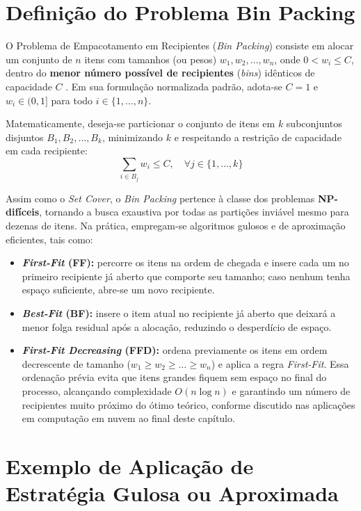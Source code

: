 \section{Definição do Problema Bin Packing}

O Problema de Empacotamento em Recipientes (\textit{Bin Packing}) consiste em alocar um conjunto de $n$ itens com tamanhos (ou pesos) $w_1, w_2, \dots, w_n$, onde $0 < w_i \le C$, dentro do \textbf{menor número possível de recipientes} (\textit{bins}) idênticos de capacidade $C$ \cite{goldbarg2005, miyazawa_aprox}. Em sua formulação normalizada padrão, adota-se $C = 1$ e $w_i \in (0, 1]$ para todo $i \in \{1, \dots, n\}$.

Matematicamente, deseja-se particionar o conjunto de itens em $k$ subconjuntos disjuntos $B_1, B_2, \dots, B_k$, minimizando $k$ e respeitando a restrição de capacidade em cada recipiente:
\begin{equation}
    \sum_{i \in B_j} w_i \le C, \quad \forall j \in \{1, \dots, k\}
\end{equation}

Assim como o \textit{Set Cover}, o \textit{Bin Packing} pertence à classe dos problemas \textbf{NP-difíceis}, tornando a busca exaustiva por todas as partições inviável mesmo para dezenas de itens. Na prática, empregam-se algoritmos gulosos e de aproximação eficientes, tais como:
\begin{itemize}
    \item \textbf{\textit{First-Fit} (FF):} percorre os itens na ordem de chegada e insere cada um no primeiro recipiente já aberto que comporte seu tamanho; caso nenhum tenha espaço suficiente, abre-se um novo recipiente.
    \item \textbf{\textit{Best-Fit} (BF):} insere o item atual no recipiente já aberto que deixará a menor folga residual após a alocação, reduzindo o desperdício de espaço.
    \item \textbf{\textit{First-Fit Decreasing} (FFD):} ordena previamente os itens em ordem decrescente de tamanho ($w_1 \ge w_2 \ge \dots \ge w_n$) e aplica a regra \textit{First-Fit}. Essa ordenação prévia evita que itens grandes fiquem sem espaço no final do processo, alcançando complexidade $O(n \log n)$ e garantindo um número de recipientes muito próximo do ótimo teórico, conforme discutido nas aplicações em computação em nuvem ao final deste capítulo.
\end{itemize}

\section{Exemplo de Aplicação de Estratégia Gulosa ou Aproximada}

